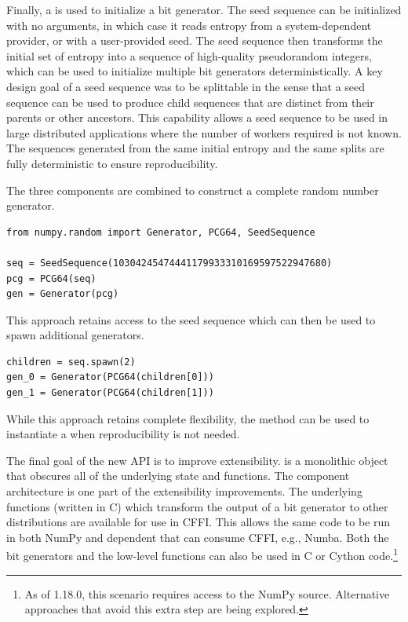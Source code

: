 Finally, a  is used to initialize a bit generator. The seed
sequence can be initialized with no arguments, in which case it reads entropy
from a system-dependent provider, or with a user-provided seed. The seed
sequence then transforms the initial set of entropy into a sequence of
high-quality pseudorandom integers, which can be used to initialize multiple bit
generators deterministically. A key design goal of a seed sequence was to be
splittable in the sense that a seed sequence can be used to produce child
sequences that are distinct from their parents or other ancestors. This
capability allows a seed sequence to be used in large distributed applications
where the number of workers required is not known. The sequences generated from
the same initial entropy and the same splits are fully deterministic to ensure
reproducibility.

The three components are combined to construct a complete random number
generator.

\begin{lstlisting}
from numpy.random import Generator, PCG64, SeedSequence

seq = SeedSequence(10304245474441179933310169597522947680)
pcg = PCG64(seq)
gen = Generator(pcg)
\end{lstlisting}

\noindent This approach retains access to the seed sequence which can then be
used to spawn additional generators.

\begin{lstlisting}
children = seq.spawn(2)
gen_0 = Generator(PCG64(children[0]))
gen_1 = Generator(PCG64(children[1]))
\end{lstlisting}

\noindent While this approach retains complete flexibility, the method
 can be used to instantiate a  when
reproducibility is not needed.

The final goal of the new API is to improve extensibility.  is
a monolithic object that obscures all of the underlying state and functions. The
component architecture is one part of the extensibility improvements. The
underlying functions (written in C) which transform the output of a bit
generator to other distributions are available for use in CFFI. This allows the
same code to be run in both NumPy and dependent that can consume CFFI, e.g.,
Numba. Both the bit generators and the low-level functions can also be used in C
or Cython code.\footnote{As of 1.18.0, this scenario requires access to the
NumPy source. Alternative approaches that avoid this extra step are being
explored.} 

